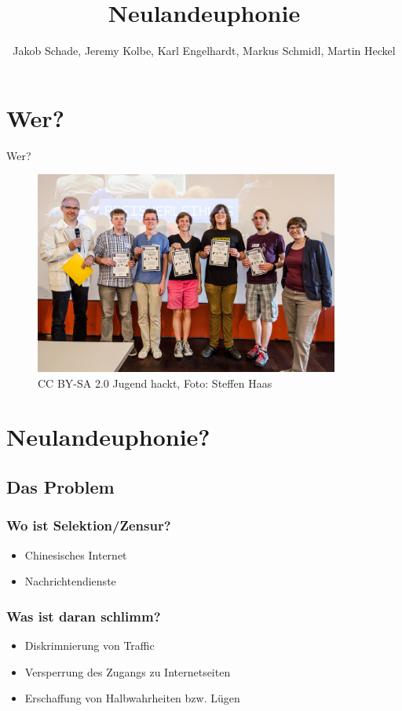 \documentclass [xcolor=dvipsnames] {beamer}
\title {\sc Neulandeuphonie}
\author {Jakob Schade, Jeremy Kolbe, Karl Engelhardt, Markus Schmidl, Martin Heckel}
\begin{document}
\begin{frame}
	\titlepage
\end{frame}

\begin{frame}
	\tableofcontents
\end{frame}

\section{Wer?}
\begin{frame}
	\begin{center}
		{\Huge Wer?}
	\end{center}
\end{frame}
\begin{frame}
	\begin{figure}
		\includegraphics[width=10cm]{jhost2015abschluss}
		\caption{CC BY-SA 2.0 Jugend hackt, Foto: Steffen Haas}
	\end{figure}
\end{frame}

\section{Neulandeuphonie?}
\subsection{Das Problem}
\begin{frame}
	\frametitle{\sc Wo ist Selektion/Zensur?}
	\begin{itemize}
		\item Chinesisches Internet
		\item Nachrichtendienste
	\end{itemize}
\end{frame}
\begin{frame}
	\frametitle{\sc Was ist daran schlimm?}
	\begin{itemize}
		\item Diskrimnierung von Traffic
		\item Versperrung des Zugangs zu Internetseiten
		\item Erschaffung von Halbwahrheiten bzw. Lügen
	\end{itemize}
\end{frame}
\end{document}

